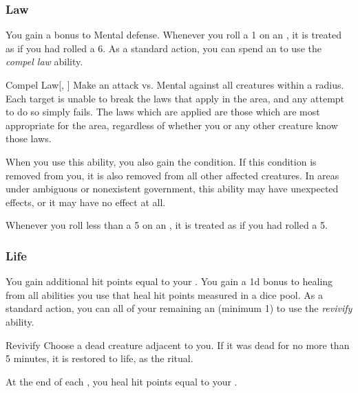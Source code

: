         \subsubsection{Law}
             You gain a  bonus to Mental defense.
             Whenever you roll a 1 on an , it is treated as if you had rolled a 6.
             As a standard action, you can spend an  to use the \textit{compel law} ability.
            \begin{ability}{Compel Law}[, ]
                Make an attack vs. Mental against all creatures within a \arealarge radius.
                \hit Each target is unable to break the laws that apply in the area, and any attempt to do so simply fails.
                The laws which are applied are those which are most appropriate for the area, regardless of whether you or any other creature know those laws.

                When you use this ability, you also gain the condition.
                If this condition is removed from you, it is also removed from all other affected creatures.
                In areas under ambiguous or nonexistent government, this ability may have unexpected effects, or it may have no effect at all.
            \end{ability}
             Whenever you roll less than a 5 on an , it is treated as if you had rolled a 5.

        \subsubsection{Life}
             You gain additional hit points equal to your .
             You gain a \plus1d bonus to healing from all abilities you use that heal hit points measured in a dice pool.
             As a standard action, you can all of your remaining an  (minimum 1) to use the \textit{revivify} ability.
            \begin{ability}{Revivify}
                Choose a dead creature adjacent to you.
                If it was dead for no more than 5 minutes, it is restored to life, as the  ritual.
            \end{ability}
             At the end of each , you heal hit points equal to your .

